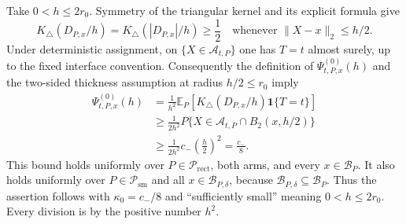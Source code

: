 Take \(0<h\leq2r_0\).  Symmetry of the triangular kernel and its explicit formula give
\[
 K_\triangle(D_{P,x}/h)=K_\triangle(|D_{P,x}|/h)\geq\frac12
 \quad\text{whenever }\lVert X-x\rVert_2\leq h/2.
\]
Under deterministic assignment, on \(\{X\in\mathcal A_{t,P}\}\) one has \(T=t\) almost surely, up to the fixed interface convention.  Consequently the definition of \(\Psi^{(0)}_{t,P,x}(h)\) and the two-sided thickness assumption at radius \(h/2\leq r_0\) imply
\[
\begin{aligned}
 \Psi^{(0)}_{t,P,x}(h)
 &=\frac1{h^2}\mathbb E_P\!\left[K_\triangle(D_{P,x}/h)\mathbf1\{T=t\}\right]\\
 &\geq\frac1{2h^2}P\{X\in\mathcal A_{t,P}\cap B_2(x,h/2)\}\\
 &\geq\frac1{2h^2}c_-\left(\frac h2\right)^2
 =\frac{c_-}{8}.
\end{aligned}
\]
This bound holds uniformly over \(P\in\mathcal P_{\mathrm{rect}}\), both arms, and every \(x\in\mathcal B_P\).  It also holds uniformly over \(P\in\mathcal P_{\mathrm{sm}}\) and all \(x\in\mathcal B_{P,\delta}\), because \(\mathcal B_{P,\delta}\subseteq\mathcal B_P\).  Thus the assertion follows with \(\kappa_0=c_-/8\) and ``sufficiently small'' meaning \(0<h\leq2r_0\).  Every division is by the positive number \(h^2\).